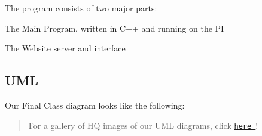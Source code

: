 The program consists of two major parts\+:
\begin{DoxyItemize}
\item The Main Program, written in C++ and running on the PI
\item The Website server and interface
\end{DoxyItemize}

\subsection*{U\+ML}

Our Final Class diagram looks like the following\+: 

\begin{quote}
For a gallery of HQ images of our U\+ML diagrams, click \href{https://github.com/itsBelinda/ENG5220-2020-Team13/wiki/UML-Diagrams}{\tt here }!\end{quote}
